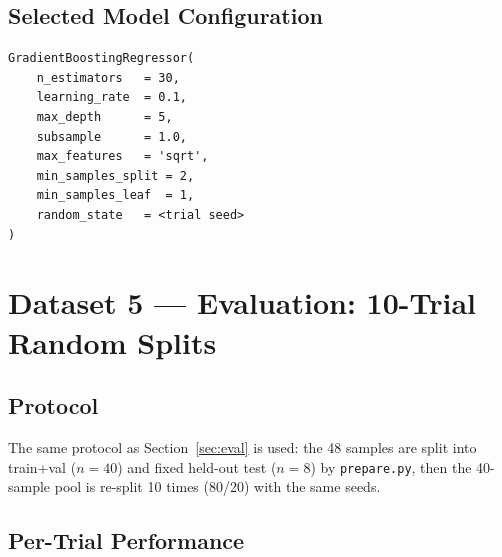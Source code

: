 \documentclass[12pt,a4paper]{article}
\begin{document}
\subsection{Selected Model Configuration}

\begin{verbatim}
GradientBoostingRegressor(
    n_estimators   = 30,
    learning_rate  = 0.1,
    max_depth      = 5,
    subsample      = 1.0,
    max_features   = 'sqrt',
    min_samples_split = 2,
    min_samples_leaf  = 1,
    random_state   = <trial seed>
)
\end{verbatim}

\section{Dataset 5 — Evaluation: 10-Trial Random Splits}
\label{sec:ds5_eval}

\subsection{Protocol}

The same protocol as Section~\ref{sec:eval} is used: the 48 samples are
split into train+val ($n=40$) and fixed held-out test ($n=8$) by
\texttt{prepare.py}, then the 40-sample pool is re-split 10 times
(80/20) with the same seeds.

\subsection{Per-Trial Performance}
\end{document}
